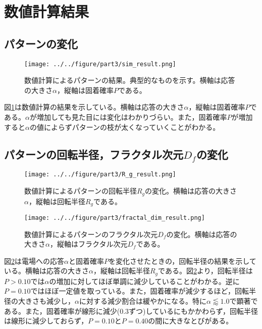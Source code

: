 \documentclass[autodetect-engine,dvi=dvipdfmx,a4paper,ja=standard,oneside,openany,11pt,draft]{bxjsbook}
\begin{document}
\section{数値計算結果}
\subsection{パターンの変化}

\begin{figure}[htbp]
  \centering
  \texttt{[image: ../../figure/part3/sim\_result.png]}
  \caption{数値計算によるパターンの結果。典型的なものを示す。横軸は応答の大きさ$\alpha$，縦軸は固着確率$P$である。}
  \label{fig:sim_result}
\end{figure}

図\ref{fig:sim_result}は数値計算の結果を示している。横軸は応答の大きさ$\alpha$，縦軸は固着確率$P$である。$\alpha$が増加しても見た目には変化はわかりづらい。また，固着確率$P$が増加すると$\alpha$の値によらずパターンの枝が太くなっていくことがわかる。
\subsection{パターンの回転半径，フラクタル次元$D_f$の変化}

\begin{figure}[htbp]
  \centering
  \texttt{[image: ../../figure/part3/R\_g\_result.png]}
  \caption{数値計算によるパターンの回転半径$R_g$の変化。横軸は応答の大きさ$\alpha$，縦軸は回転半径$R_g$である。}
  \label{fig:R_g_result}
\end{figure}

\begin{figure}
  \centering
  \texttt{[image: ../../figure/part3/fractal\_dim\_result.png]}
  \caption{数値計算によるパターンのフラクタル次元$D_f$の変化。横軸は応答の大きさ$\alpha$，縦軸はフラクタル次元$D_f$である。}
  \label{fig:fractal_dim_result}
\end{figure}

図\ref{fig:R_g_result}は電場への応答$\alpha$と固着確率$P$を変化させたときの，回転半径の結果を示している。横軸は応答の大きさ$\alpha$，縦軸は回転半径$R_g$である。図\ref{fig:R_g_result}より，回転半径は$P>0.10$では$\alpha$の増加に対してほぼ単調に減少していることがわかる。逆に$P=0.10$ではほぼ一定値を取っている。また，固着確率が減少するほど，回転半径の大きさも減少し，$\alpha$に対する減少割合は緩やかになる。特に$\alpha\lessapprox1.0$で顕著である。また，固着確率が線形に減少(0.3ずつ)しているにもかかわらず，回転半径は線形に減少しておらず，$P=0.10$と$P=0.40$の間に大きなとびがある。
\end{document}
